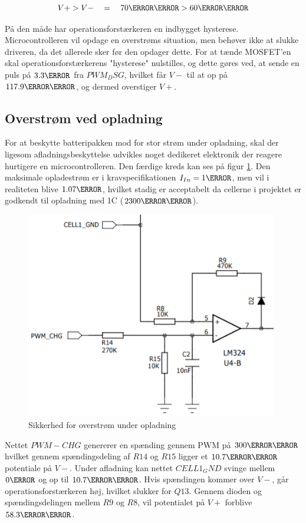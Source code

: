 \begin {equation} 
V+ > V- \quad = \quad 70\milli\volt > 60\milli\volt
\end {equation}

På den måde har operationsforstærkeren en indbygget hysterese.
Microcontrolleren vil opdage en overstrøms situation, men behøver ikke at slukke driveren, da det allerede sker før den opdager dette. For at tænde MOSFET'en skal operationsforstærkerens "hysterese" nulstilles, og dette gøres ved, at sende en puls på $3.3\volt$ fra $PWM_DSG$, hvilket får $V-$ til at op på $117.9\milli\volt$, og dermed overstiger $V+$.


\subsection{Overstrøm ved opladning}
For at beskytte batteripakken mod for stor strøm under opladning, skal der ligesom afladningsbeskyttelse udvikles noget dedikeret elektronik der reagere hurtigere en microcontrolleren. Den færdige kreds kan ses på figur \ref{fig:overcurrent_charge}. Den maksimale opladestrøm er i kravspecifikationen $I_{In}=1\ampere$, men vil i realiteten blive $1.07\ampere$, hvilket stadig er acceptabelt da cellerne i projektet er godkendt til opladning med 1C ($2300\milli\ampere$).
\\

\begin{figure}[h]
	\centering
	\includegraphics[width=11cm]{billeder/overcurrent_charge.png}
	\caption{Sikkerhed for overstrøm under opladning}
	\label{fig:overcurrent_charge}
\end{figure}

Nettet $PWM-CHG$ genererer en spænding gennem PWM på $300\milli\volt$ hvilket gennem spændingsdeling af $R14$ og $R15$ ligger et $10.7\milli\volt$ potentiale på $V-$. Under afladning kan nettet $CELL1_GND$ svinge mellem $0\volt$ og op til $10.7\milli\volt$. Hvis spændingen kommer over $V-$, går operationsforstærkeren høj, hvilket slukker for $Q13$. Gennem dioden og spændingsdelingen mellem $R9$ og $R8$, vil potentialet på $V+$ forblive $58.3\milli\volt$.
\\

